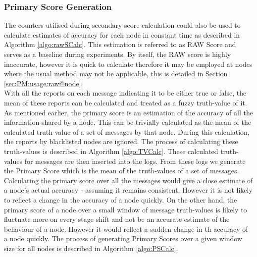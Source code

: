 \documentclass[journal]{IEEEtran}
\begin{document}
\subsubsection{Primary Score Generation}
The counters utilised during secondary score calculation could also be used to calculate estimates of accuracy for each node in constant time as described in %
Algorithm \ref{algo:rawSCalc}. This estimation is referred to as RAW Score and serves as a baseline during experiments. By itself, the RAW score is highly inaccurate, however it is quick to calculate therefore it may be employed at nodes where the usual method may not be applicable, this is detailed in Section \ref{sec:PM:usage:raw@node}.\\
With all the reports on each message indicating it to be either true or false, the mean of these reports can be calculated and treated as a fuzzy truth-value of it. As mentioned earlier, the primary score is an estimation of the accuracy of all the information shared by a node. This can be trivially calculated as the mean of the calculated truth-value of a set of messages by that node. During this calculation, the reports by blacklisted nodes are ignored. The process of calculating these truth-values is described in %
Algorithm \ref{algo:TVCalc}. These calculated truth-values for messages are then inserted into the logs. From these logs we generate the Primary Score which is the mean of the truth-values of a set of messages. Calculating the primary score over all the messages would give a close estimate of a node's actual accuracy - assuming it remains consistent. However it is not likely to reflect a change in the accuracy of a node quickly. On the other hand, the primary score of a node over a small window of message truth-values is likely to fluctuate more on every stage shift and not be an accurate estimate of the behaviour of a node. However it would reflect a sudden change in th accuracy of a node quickly. The process of generating Primary Scores over a given window size for all nodes is described in %
Algorithm \ref{algo:PSCalc}.
\end{document}
